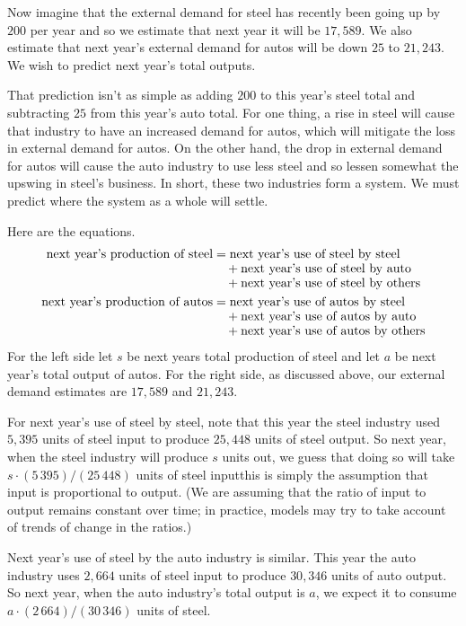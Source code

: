 Now imagine that the external demand for steel has recently been going up by
$200$ per year and so we estimate that next year it will be $17,589$.
We also estimate that next year's 
external demand for autos will be down $25$ to $21,243$.
We wish to predict next year's total outputs.

That prediction isn't as simple as adding $200$ to this year's steel
total and subtracting $25$ from this year's auto total.
For one thing, a rise in steel will cause
that industry to have an increased demand for autos, which will mitigate
the loss in external demand for autos.
On the other hand, the drop in external demand for autos will cause
the auto industry to use less steel and so lessen somewhat the
upswing in steel's business.
In short, these two industries form a system.
We must predict where the system as a whole will settle.

Here are the equations.
\begin{align*}
  \text{next year's production of steel}
     &=\text{next year's use of steel by steel}   \\[-.8ex]
     &\quad\hbox{}+\text{next year's use of steel by auto}  \\[-.8ex]  
     &\quad\hbox{}+\text{next year's use of steel by others} \\
  \text{next year's production of autos}
     &=\text{next year's use of autos by steel}   \\[-.8ex]
     &\quad\hbox{}+\text{next year's use of autos by auto}  \\[-.8ex] 
     &\quad\hbox{}+\text{next year's use of autos by others} 
\end{align*}
For the left side let
$s$ be next years total production of steel and
let $a$ be next year's total output of autos.
For the right side, as discussed above,
our external demand estimates are $17,589$ and $21,243$.

For next year's use of steel by steel, note that this year the
steel industry used $5,395$ units of steel input to produce $25,448$ units of
steel output.
So next year, when the steel industry will produce $s$ units out, 
we guess that doing so will take $s\cdot (5\,395)/(25\,448)$
units of steel input\Dash this is simply the assumption that input is
proportional to output. 
(We are assuming that the ratio of input to output remains constant over time;
in practice, models may try to take account of trends of change in the
ratios.)

Next year's use of steel by the auto industry is similar.
This year the auto industry uses $2,664$ units of steel input to produce
$30,346$ units of auto output.
So next year, when the auto industry's total output is $a$, we expect it to 
consume $a\cdot (2\,664)/(30\,346)$ units of steel.

